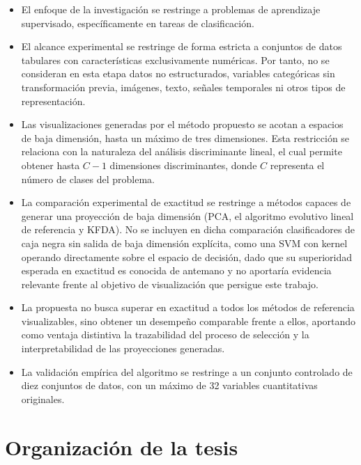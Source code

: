	\begin{itemize}
		
		\item El enfoque de la investigación se restringe a problemas de aprendizaje supervisado, específicamente en tareas de clasificación.
		
		\item El alcance experimental se restringe de forma estricta a conjuntos de datos tabulares con características exclusivamente numéricas. Por tanto, no se consideran en esta etapa datos no estructurados, variables categóricas sin transformación previa, imágenes, texto, señales temporales ni otros tipos de representación.
		
		\item Las visualizaciones generadas por el método propuesto se acotan a espacios de baja dimensión, hasta un máximo de tres dimensiones. Esta restricción se relaciona con la naturaleza del análisis discriminante lineal, el cual permite obtener hasta $C - 1$ dimensiones discriminantes, donde $C$ representa el número de clases del problema.
		
		\item La comparación experimental de exactitud se restringe a métodos capaces de generar una proyección de baja dimensión (PCA, el algoritmo evolutivo lineal de referencia y KFDA). No se incluyen en dicha comparación clasificadores de caja negra sin salida de baja dimensión explícita, como una SVM con kernel operando directamente sobre el espacio de decisión, dado que su superioridad esperada en exactitud es conocida de antemano y no aportaría evidencia relevante frente al objetivo de visualización que persigue este trabajo.
		
		\item La propuesta no busca superar en exactitud a todos los métodos de referencia visualizables, sino obtener un desempeño comparable frente a ellos, aportando como ventaja distintiva la trazabilidad del proceso de selección y la interpretabilidad de las proyecciones generadas.
		
		\item La validación empírica del algoritmo se restringe a un conjunto controlado de diez conjuntos de datos, con un máximo de 32 variables cuantitativas originales.
		
	\end{itemize}
	
	\section{Organización de la tesis}
	\label{sec:Organización-Tesis}
	
